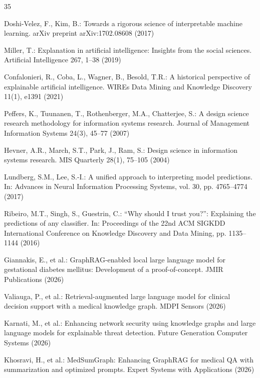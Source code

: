 \documentclass[lnbip]{svmultln}
\begin{document}
%
\begin{thebibliography}{35}


 Doshi-Velez, F., Kim, B.: Towards a rigorous science of interpretable machine learning. arXiv preprint arXiv:1702.08608 (2017)

 Miller, T.: Explanation in artificial intelligence: Insights from the social sciences. Artificial Intelligence 267, 1--38 (2019)

 Confalonieri, R., Coba, L., Wagner, B., Besold, T.R.: A historical perspective of explainable artificial intelligence. WIREs Data Mining and Knowledge Discovery 11(1), e1391 (2021)

 Peffers, K., Tuunanen, T., Rothenberger, M.A., Chatterjee, S.: A design science research methodology for information systems research. Journal of Management Information Systems 24(3), 45--77 (2007)

 Hevner, A.R., March, S.T., Park, J., Ram, S.: Design science in information systems research. MIS Quarterly 28(1), 75--105 (2004)

 Lundberg, S.M., Lee, S.-I.: A unified approach to interpreting model predictions. In: Advances in Neural Information Processing Systems, vol. 30, pp. 4765--4774 (2017)

 Ribeiro, M.T., Singh, S., Guestrin, C.: ``Why should I trust you?'': Explaining the predictions of any classifier. In: Proceedings of the 22nd ACM SIGKDD International Conference on Knowledge Discovery and Data Mining, pp. 1135--1144 (2016)


 Giannakis, E., et al.: GraphRAG-enabled local large language model for gestational diabetes mellitus: Development of a proof-of-concept. JMIR Publications (2026)

 Valiauga, P., et al.: Retrieval-augmented large language model for clinical decision support with a medical knowledge graph. MDPI Sensors (2026)

 Karnati, M., et al.: Enhancing network security using knowledge graphs and large language models for explainable threat detection. Future Generation Computer Systems (2026)

 Khosravi, H., et al.: MedSumGraph: Enhancing GraphRAG for medical QA with summarization and optimized prompts. Expert Systems with Applications (2026)


\end{thebibliography}
\end{document}

